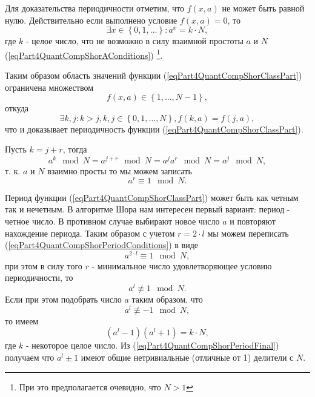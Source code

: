 Для доказательства периодичности отметим, что $f\left(x, a\right)$ не
может быть равной нулю. Действительно если выполнено условие
$f\left(x, a\right) = 0$, то 
\[
\exists x \in \left\{0, 1, \dots\right\}:
a^x = k \cdot N,
\]
где $k$ - целое число, что не возможно в силу
взаимной простоты $a$ и $N$ (\ref{eqPart4QuantCompShorAConditions})
\footnote{При это предполагается очевидно, что $N > 1$}.

Таким образом область значений функции
(\ref{eqPart4QuantCompShorClassPart}) ограничена множеством 
\begin{equation}
f\left(x,
a\right) \in \left\{1, \dots, N - 1\right\},
\nonumber
\end{equation}
откуда 
\begin{equation}
\exists k,j: k > j, k,j \in \left\{0, 1, \dots, N\right\},
f\left(k,a\right) = f\left(j,a\right),
\nonumber
\end{equation}
что и доказывает периодичность функции (\ref{eqPart4QuantCompShorClassPart}).

Пусть $k = j + r$, тогда
\[
a^k \mod{N} = a^{j + r} \mod{N} = a^j a^r \mod{N}= a^j \mod{N},
\]
т. к. $a$ и $N$ взаимно просты то мы можем записать
\begin{equation}
a^r \equiv 1 \mod{N}.
\label{eqPart4QuantCompShorPeriodConditions}
\end{equation}


Период функции (\ref{eqPart4QuantCompShorClassPart}) может быть как
четным так и нечетным. В алгоритме Шора нам интересен первый вариант:
период - четное число. В противном случае выбирают новое число $a$ и
повторяют нахождение периода. Таким образом с учетом $r= 2\cdot l$ мы
можем переписать (\ref{eqPart4QuantCompShorPeriodConditions}) в виде
\begin{equation}
a^{2 \cdot l} \equiv 1 \mod{N},
\nonumber
\end{equation}
при этом в силу того $r$ - минимальное число удовлетворяющее условию
периодичности, то
\[
a^{l} \not\equiv 1 \mod{N}.
\]
Если при этом подобрать число $a$ таким образом, что 
\[
a^{l} \not\equiv -1 \mod{N},
\]
то имеем 
\begin{equation}
\left(a^l - 1\right)\left(a^l + 1\right) = k \cdot N,
\label{eqPart4QuantCompShorPeriodFinal}
\end{equation}
где $k$ - некоторое целое число. Из
(\ref{eqPart4QuantCompShorPeriodFinal}) получаем что $a^l \pm 1$ имеют
общие нетривиальные (отличные от 1) делители с $N$.

